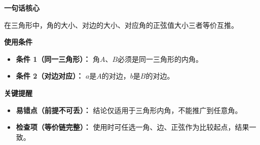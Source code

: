 \begin{summarybox}
	\textbf{\textcolor{CSummary}{一句话核心}}

	在三角形中，角的大小、对边的大小、对应角的正弦值大小三者等价互推。

	\medskip
	\textbf{\textcolor{CSummary}{使用条件}}
	\begin{itemize}[leftmargin=*, itemsep=0.5em, topsep=0.4em]
		\item \textbf{条件 1（同一三角形）：} 角$A$、$B$必须是同一三角形的内角。
		\item \textbf{条件 2（对边对应）：} $a$是$A$的对边，$b$是$B$的对边。
	\end{itemize}

	\medskip
	\textbf{\textcolor{CSummary}{关键提醒}}
	\begin{itemize}[leftmargin=*, itemsep=0.5em, topsep=0.4em]
		\item \textbf{易错点（前提不可丢）：} 结论仅适用于三角形内角，不能推广到任意角。
		\item \textbf{检查项（等价链完整）：} 使用时可任选一角、边、正弦作为比较起点，结果一致。
	\end{itemize}
\end{summarybox}
